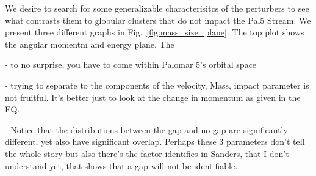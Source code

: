 \documentclass[draft]{aa}
\begin{document}
    We desire to search for some generalizable characterisitcs of the perturbers to see what contrasts them to globular clusters that do not impact the Pal5 Stream. We present three different graphs in Fig.~\ref{fig:mass_size_plane}. The top plot shows the angular momentm and energy plane. The 
    
    - to no surprise, you have to come within Palomar 5's orbital space 
    
    - trying to separate to the components of the velocity, Mass, impact parameter is not fruitful. It's better just to look at the change in momentum as given in the EQ.
    
    - Notice that the distributions between the gap and no gap are significantly different, yet also have significant overlap. Perhaps these 3 parameters don't tell the whole story but also there's the factor identifies in Sanders, that I don't understand yet, that shows that a gap will not be identifiable. 
  
\end{document}
